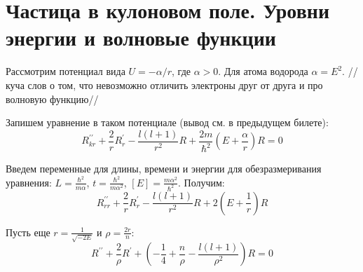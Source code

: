 \newpage
\chapter{Частица в кулоновом поле. Уровни энергии и волновые функции}
\par Рассмотрим потенциал вида $U=-\alpha/r$, где $\alpha>0$. Для атома водорода $\alpha=E^2$. //куча слов о том, что невозможно отличить электроны друг от друга и про волновую функцию//
\par Запишем уравнение в таком потенциале (вывод см. в предыдущем билете):
$$R^{\prime \prime}_{kr} + \frac{2}{r}R^\prime _{r}  - \frac{l(l+1)}{r^2} R  +\frac{2m}{\hbar^2}\left( E+\frac{\alpha}{r}\right)R=0$$
\par Введем переменные для длины, времени и энергии для обезразмеривания уравнения: $L = \frac{\hbar^2}{m\alpha}$, $t=\frac{\hbar^2}{m\alpha^2}$, $[E] = \frac{m\alpha^2}{\hbar^2}$. Получим:
$$R^{\prime \prime}_{rr}+ \frac{2}{r}R^\prime _{r}   - \frac{l(l+1)}{r^2} R + 2\left(E+\frac{1}{r} \right)R $$
\par Пусть еще $r = \frac{1}{\sqrt{-2E}}$ и $\rho = \frac{2r}{n}$:
$$R^{\prime \prime} +\frac{2}{\rho} R^\prime + \left(-\frac{1}{4} + \frac{n}{\rho}-\frac{l(l+1)}{\rho^2} \right)R=0$$

